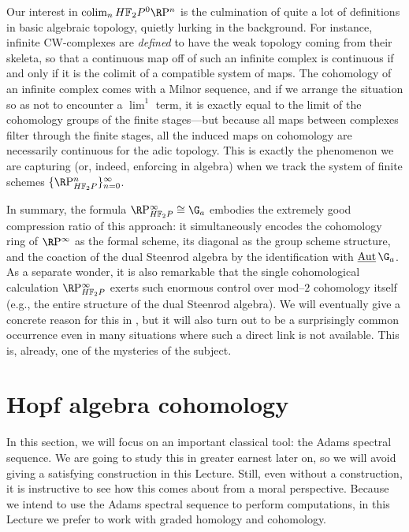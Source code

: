 \begin{remark}
Our interest in \(\colim_n \HFtwo P^0 \RP^n\) is the culmination of quite a lot of definitions in basic algebraic topology, quietly lurking in the background.  For instance, infinite CW-complexes are \emph{defined} to have the weak topology coming from their skeleta, so that a continuous map off of such an infinite complex is continuous if and only if it is the colimit of a compatible system of maps.  The cohomology of an infinite complex comes with a Milnor sequence, and if we arrange the situation so as not to encounter a \(\lim^1\) term, it is exactly equal to the limit of the cohomology groups of the finite stages---but because all maps between complexes filter through the finite stages, all the induced maps on cohomology are necessarily continuous for the adic topology.  This is exactly the phenomenon we are capturing (or, indeed, enforcing in algebra) when we track the system of finite schemes \(\{\RP^n_{\HFtwo P}\}_{n=0}^\infty\).
\end{remark}

In summary, the formula \(\RP^\infty_{\HFtwo P} \cong \G_a\) embodies the extremely good compression ratio of this approach: it simultaneously encodes the cohomology ring of \(\RP^\infty\) as the formal scheme, its diagonal as the group scheme structure, and the coaction of the dual Steenrod algebra by the identification with \(\InternalAut{\G_a}\).  As a separate wonder, it is also remarkable that the single cohomological calculation \(\RP^\infty_{\HFtwo P}\) exerts such enormous control over mod--\(2\) cohomology itself (e.g., the entire structure of the dual Steenrod algebra).  We will eventually give a concrete reason for this in , but it will also turn out to be a surprisingly common occurrence even in many situations where such a direct link is not available.  This is, already, one of the mysteries of the subject.








\section{Hopf algebra cohomology}\label{HopfAlgebraLecture}

In this section, we will focus on an important classical tool: the Adams spectral sequence.  We are going to study this in greater earnest later on, so we will avoid giving a satisfying construction in this Lecture.  Still, even without a construction, it is instructive to see how this comes about from a moral perspective.  Because we intend to use the Adams spectral sequence to perform computations, in this Lecture we prefer to work with graded homology and cohomology.

